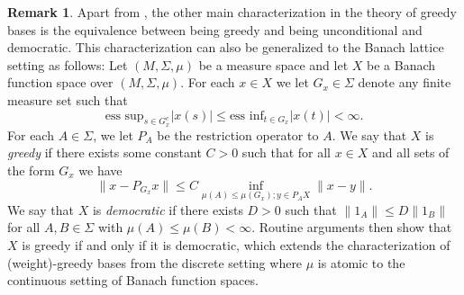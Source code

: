 \documentclass[12pt,leqno]{amsart}
\numberwithin{equation}{section}
\theoremstyle{definition}
\newtheorem{remark}[theorem]{Remark}
\begin{document}
\begin{remark}
    Apart from , the other main characterization in the theory of greedy bases is the equivalence between being greedy and being unconditional and democratic. This characterization can also be generalized to the Banach lattice setting as follows: Let $(M,\Sigma,\mu)$ be a measure space and let $X$ be a Banach function space over $(M,\Sigma,\mu)$.   For each $x\in X$ we let $G_{x}\in\Sigma$ denote any finite measure  set such that
$$ \text{ess sup}_{s\in G^c_{x}}|x(s)|\leq \text{ess inf}_{t\in G_{x}}|x(t)|<\infty.$$
 For each $A\in\Sigma$, we let $P_A$ be the restriction operator to $A$.  We say that $X$ is \emph{greedy} if there exists some constant $C>0$ such that for all $x\in X$ and all sets of the form $G_{x}$ we have  
\begin{equation*}\label{greedy}
\|x-P_{G_{x}}x\|\leq C \inf_{\mu(A)\leq\mu(G_x);y\in P_A X}\|x-y\|.
\end{equation*}
We say that $X$ is {\em democratic} if there exists $D>0$ such that $\|1_A\|\leq D\|1_B\|$ for all $A,B\in\Sigma$ with $\mu(A)\leq  \mu(B)<\infty$. 
Routine arguments then show that $X$ is greedy if and only if it is democratic, which extends the characterization of (weight)-greedy bases from the discrete setting where $\mu$ is atomic to the continuous setting of Banach function spaces.
\end{remark}


\end{document}
